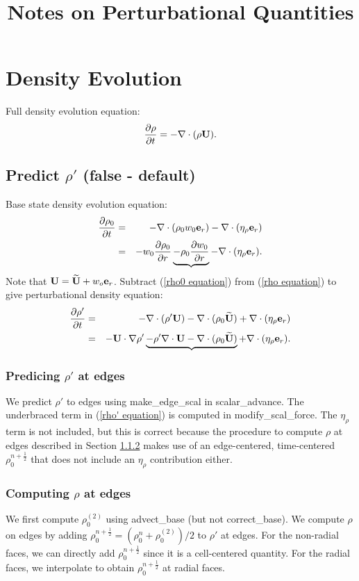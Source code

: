 \documentclass[11pt]{article}
\title{Notes on Perturbational Quantities}
\def\half  {\frac{1}{2}}
\def\eb    {{\bf e}}
\def\Ub    {{\bf U}}
\def\Ubt   {\widetilde{\bf U}}
\begin{document}
\maketitle
\tableofcontents
\cleardoublepage

\section{Density Evolution}
Full density evolution equation:
\begin{equation}
\frac{\partial\rho}{\partial t} = -\nabla\cdot(\rho\Ub). \label{rho equation}
\end{equation}
\subsection{Predict $\rho'$ (false - default)}
Base state density evolution equation:
\begin{eqnarray}
\frac{\partial\rho_0}{\partial t} &=& -\nabla\cdot(\rho_0 w_0 \eb_r) - \nabla\cdot(\eta_\rho \eb_r) \nonumber \\
&=& -w_0\frac{\partial\rho_0}{\partial r} \underbrace{- \rho_0\frac{\partial w_0}{\partial r}} - \nabla\cdot(\eta_\rho \eb_r). \label{rho0 equation}
\end{eqnarray}
Note that $\Ub = \Ubt + w_o\eb_r$.  Subtract (\ref{rho0 equation}) from (\ref{rho equation}) to give perturbational density equation:
\begin{eqnarray}
\frac{\partial\rho'}{\partial t} &=& -\nabla\cdot(\rho'\Ub) - \nabla\cdot(\rho_0\Ubt) + \nabla\cdot(\eta_\rho \eb_r) \nonumber \\
&=& -\Ub\cdot\nabla\rho' \underbrace{- \rho'\nabla\cdot\Ub - \nabla\cdot(\rho_0\Ubt)} + \nabla\cdot(\eta_\rho \eb_r).\label{rho' equation}
\end{eqnarray}
\subsubsection{Predicing $\rho'$ at edges}
We predict $\rho'$ to edges using make\_edge\_scal in scalar\_advance.  The underbraced term in (\ref{rho' equation}) is computed in modify\_scal\_force.  The $\eta_\rho$ term is not included, but this is correct because the procedure to compute $\rho$ at edges described in Section \ref{Computing rho at edges} makes use of an edge-centered, time-centered $\rho_0^{n+\half}$ that does not include an $\eta_\rho$ contribution either.
\subsubsection{Computing $\rho$ at edges}\label{Computing rho at edges}
We first compute $\rho_0^{(2)}$ using advect\_base (but not correct\_base).  We compute $\rho$ on edges by adding $\rho_0^{n+\half} = (\rho_0^n + \rho_0^{(2)}) / 2$ to $\rho'$ at edges. For the non-radial faces, we can directly add $\rho_0^{n+\half}$ since it is a cell-centered quantity.  For the radial faces, we interpolate to obtain $\rho_0^{n+\half}$ at radial faces.
\end{document}
